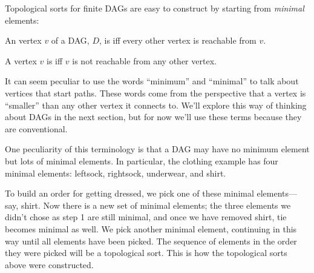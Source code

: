 Topological sorts for finite DAGs are easy to construct by starting
from \emph{minimal} elements:

\begin{definition}
  An vertex $v$ of a DAG, $D$, is
   iff every other vertex is
  reachable from $v$.

  A vertex $v$ is  iff $v$
  is not reachable from any other vertex.
\end{definition}

It can seem peculiar to use the words ``minimum'' and ``minimal'' to
talk about vertices that start paths.  These words come from the
perspective that a vertex is ``smaller'' than any other vertex it
connects to.  We'll explore this way of thinking about DAGs in the
next section, but for now we'll use these terms because they
are conventional.

One peculiarity of this terminology is that a DAG may have no minimum
element but lots of minimal elements.  In particular, the clothing
example has four minimal elements: leftsock, rightsock, underwear, and
shirt.

\iffalse
In a topological sort, minimum and minimal elements are the same thing.
\fi

To build an order for getting dressed, we pick one of these minimal
elements---say, shirt.  Now there is a new set of minimal elements;
the three elements we didn't chose as step 1 are still minimal, and once
we have removed shirt, tie becomes minimal as well.  We pick
another minimal element, continuing in this way until all elements
have been picked.  The sequence of elements in the order they were
picked will be a topological sort.  This is how the topological sorts
above were constructed.

